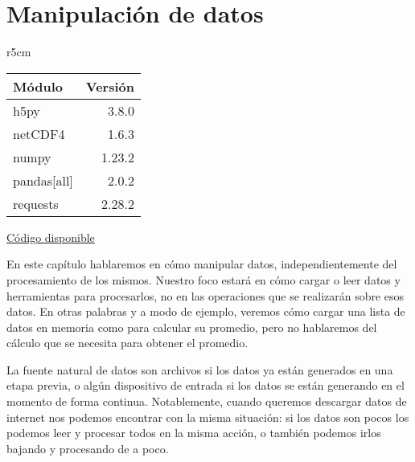 

 \chapter{Manipulación de datos} \label{ch:datos}   

\begin{wraptable}{r}{5cm}
\begin{modulesinfo}
\begin{center}
{\small
    \begin{tabular}{l r}
        \toprule
        \textbf{Módulo} & \textbf{Versión} \\
        \midrule
        h5py & 3.8.0 \\
        netCDF4 & 1.6.3 \\
        numpy & 1.23.2 \\
        pandas[all] & 2.0.2 \\
        requests & 2.28.2 \\
        \bottomrule
    \end{tabular}
    \vspace{0.75em}
    
    \href{https://github.com/facundobatista/libro-pyciencia/tree/master/código/manipulacion_datos/}{Código disponible}
}
\end{center}
\end{modulesinfo}
\end{wraptable}

En este capítulo hablaremos en cómo manipular datos, independientemente del procesamiento de los mismos. Nuestro foco estará en cómo cargar o leer datos y herramientas para procesarlos, no en las operaciones que se realizarán sobre esos datos. En otras palabras y a modo de ejemplo, veremos cómo cargar una lista de datos en memoria como para calcular su promedio, pero no hablaremos del cálculo que se necesita para obtener el promedio.

La fuente natural de datos son archivos si los datos ya están generados en una etapa previa, o algún dispositivo de entrada si los datos se están generando en el momento de forma continua. Notablemente, cuando queremos descargar datos de internet nos podemos encontrar con la misma situación: si los datos son pocos los podemos leer y procesar todos en la misma acción, o también podemos irlos bajando y procesando de a poco.

